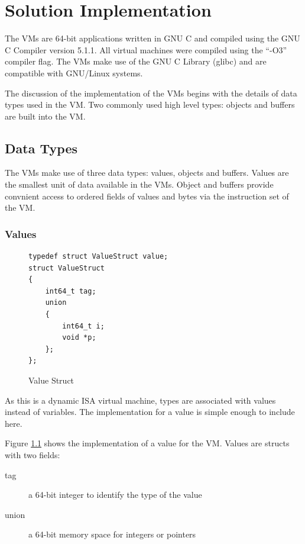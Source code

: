\documentclass[english,a4paper,12pt]{report}
\begin{document}
\chapter{Solution Implementation}

The VMs are 64-bit applications written in GNU C and compiled using
the GNU C Compiler version 5.1.1. All virtual machines were compiled
using the ``-O3'' compiler flag. The VMs make use of the GNU C Library
(glibc) and are compatible with GNU/Linux systems.

The discussion of the implementation of the VMs begins with the
details of data types used in the VM. Two commonly used high level
types: objects and buffers are built into the VM.

\section{Data Types}
The VMs make use of three data types: values, objects and
buffers. Values are the smallest unit of data available in the
VMs. Object and buffers provide convnient access to ordered fields of
values and bytes via the instruction set of the VM.

\subsection{Values}
\label{values-implementation}

\begin{figure}[!htb]

	\begin{lstlisting}
typedef struct ValueStruct value; 
struct ValueStruct 
{ 
    int64_t tag; 
    union 
    { 
        int64_t i; 
        void *p; 
    }; 
};
	\end{lstlisting}
	\caption{Value Struct}
		\label{fig:struct}
\end{figure}

As this is a dynamic ISA virtual machine, types are associated with
values instead of variables\cite{RobertoIerusalimschy}. The
implementation for a value is simple enough to include here.

Figure \ref{fig:struct} shows the implementation of a value for the
VM. Values are structs with two fields:
\begin{description}
	\item[tag] a 64-bit integer to identify the type of the value
	\item[union] a 64-bit memory space for integers or pointers
\end{description}
\end{document}

